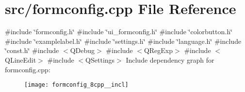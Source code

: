 \section{src/formconfig.cpp File Reference}
\label{formconfig_8cpp}
{\ttfamily \#include \char`\"{}formconfig.\+h\char`\"{}}\newline
{\ttfamily \#include \char`\"{}ui\+\_\+formconfig.\+h\char`\"{}}\newline
{\ttfamily \#include \char`\"{}colorbutton.\+h\char`\"{}}\newline
{\ttfamily \#include \char`\"{}examplelabel.\+h\char`\"{}}\newline
{\ttfamily \#include \char`\"{}settings.\+h\char`\"{}}\newline
{\ttfamily \#include \char`\"{}language.\+h\char`\"{}}\newline
{\ttfamily \#include \char`\"{}const.\+h\char`\"{}}\newline
{\ttfamily \#include $<$Q\+Debug$>$}\newline
{\ttfamily \#include $<$Q\+Reg\+Exp$>$}\newline
{\ttfamily \#include $<$Q\+Line\+Edit$>$}\newline
{\ttfamily \#include $<$Q\+Settings$>$}\newline
Include dependency graph for formconfig.\+cpp\+:\nopagebreak
\begin{figure}[H]
\begin{center}
\leavevmode
\texttt{[image: formconfig\_8cpp\_\_incl]}
\end{center}
\end{figure}

